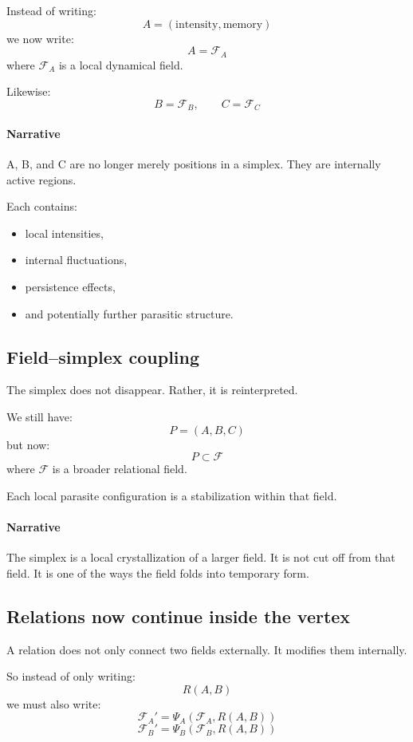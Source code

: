 \documentclass[11pt]{article}
\begin{document}
Instead of writing:
\[
A = (\text{intensity}, \text{memory})
\]
we now write:
\[
A = \mathcal{F}_A
\]
where $\mathcal{F}_A$ is a local dynamical field.

Likewise:
\[
B = \mathcal{F}_B, \qquad C = \mathcal{F}_C
\]

\paragraph{Narrative}
A, B, and C are no longer merely positions in a simplex.
They are internally active regions.

Each contains:
\begin{itemize}
\item local intensities,
\item internal fluctuations,
\item persistence effects,
\item and potentially further parasitic structure.
\end{itemize}

\subsection*{Field--simplex coupling}

The simplex does not disappear.
Rather, it is reinterpreted.

We still have:
\[
P = (A,B,C)
\]
but now:
\[
P \subset \mathcal{F}
\]
where $\mathcal{F}$ is a broader relational field.

Each local parasite configuration is a stabilization within that field.

\paragraph{Narrative}
The simplex is a local crystallization of a larger field.
It is not cut off from that field.
It is one of the ways the field folds into temporary form.

\subsection*{Relations now continue inside the vertex}

A relation does not only connect two fields externally.
It modifies them internally.

So instead of only writing:
\[
R(A,B)
\]
we must also write:
\[
\mathcal{F}_A' = \Psi_A(\mathcal{F}_A, R(A,B))
\]
\[
\mathcal{F}_B' = \Psi_B(\mathcal{F}_B, R(A,B))
\]
\end{document}
